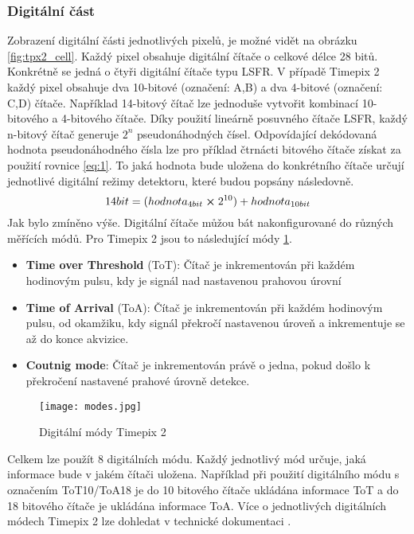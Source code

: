 \subsubsection{Digitální část}
\label{Digitálni cast}
Zobrazení digitální části jednotlivých pixelů, je možné vidět na obrázku \ref{fig:tpx2_cell}. Každý pixel obsahuje digitální čítače o celkové délce 28 bitů. Konkrétně se jedná o čtyři digitální čítače typu LSFR. V případě Timepix 2 každý pixel obsahuje dva 10-bitové (označení: A,B) a dva 4-bitové (označení: C,D) čítače. Například 14-bitový čítač lze jednoduše vytvořit kombinací 10-bitového a 4-bitového čítače. Díky použití lineárně posuvného čítače LSFR, každý n-bitový čítač generuje $2^n$ pseudonáhodných čísel. Odpovídající dekódovaná hodnota pseudonáhodného čísla lze pro příklad čtrnácti bitového čítače získat za použití rovnice \ref{eq:1}. To jaká hodnota bude uložena do konkrétního čítače určují jednotlivé digitální režimy detektoru, které budou popsány následovně.
\begin{equation}
	14bit = (hodnota_{4bit} \cross 2^{10}) + hodnota_{10bit}
	\label{eq:1}
\end{equation}
Jak bylo zmíněno výše. Digitální čítače můžou bát nakonfigurované do různých měřících módů. Pro Timepix 2 jsou to následující módy \ref{fig:modes}. 
\begin{itemize}
	\item \textbf{Time over Threshold} (ToT): Čítač je inkrementován při každém hodinovým pulsu, kdy je signál nad nastavenou prahovou úrovní
	\item \textbf{Time of Arrival} (ToA): Čítač je inkrementován při každém hodinovým pulsu, od okamžiku, kdy signál překročí nastavenou úroveň a inkrementuje se až do konce akvizice.
	\item \textbf{Coutnig mode}: Čítač je inkrementován právě o jedna, pokud došlo k překročení nastavené prahové úrovně detekce.
\label{item:modes}
\end{itemize}
\begin{figure}[h!]
	\centering
	\captionsetup{justification=centering}
	\texttt{[image: modes.jpg]}
	\caption{Digitální módy Timepix 2 \cite{Manek}} 
	\label{fig:modes}
\end{figure}	
\par Celkem lze použít 8 digitálních módu. Každý jednotlivý mód určuje, jaká informace bude v jakém čítači uložena. Například při použití digitálního módu s označením ToT10/ToA18  je do 10 bitového čítače ukládána informace ToT a do 18 bitového čítače je ukládána informace ToA. Více o jednotlivých digitálních módech Timepix 2 lze dohledat v technické dokumentaci \cite{tpx2_manual}.

